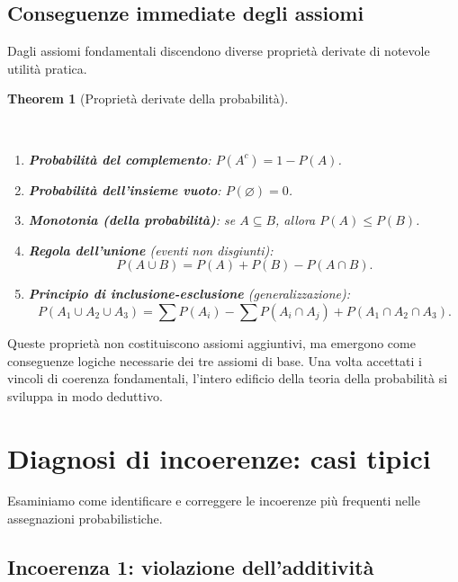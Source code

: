 \documentclass[
  letterpaper,
  DIV=11,
  numbers=noendperiod,
  oneside]{scrreprt}
\providecommand{\tightlist}{%
  \setlength{\itemsep}{0pt}\setlength{\parskip}{0pt}}
\theoremstyle{definition}
\theoremstyle{plain}
\newtheorem{theorem}{Theorem}[chapter]
\theoremstyle{definition}
\theoremstyle{remark}
\begin{document}
\subsection{Conseguenze immediate degli
assiomi}\label{conseguenze-immediate-degli-assiomi}

Dagli assiomi fondamentali discendono diverse proprietà derivate di
notevole utilità pratica.

\begin{theorem}[Proprietà derivate della
probabilità]\protect\hypertarget{thm-probability-properties}{}\label{thm-probability-properties}

~

\begin{enumerate}
\def\labelenumi{\arabic{enumi}.}
\tightlist
\item
  \textbf{Probabilità del complemento}: \(P(A^c) = 1 - P(A)\).
\item
  \textbf{Probabilità dell'insieme vuoto}: \(P(\varnothing) = 0\).
\item
  \textbf{Monotonia (della probabilità)}: se \(A \subseteq B\), allora
  \(P(A) \leq P(B)\).
\item
  \textbf{Regola dell'unione} (eventi non disgiunti):
  \[P(A \cup B) = P(A) + P(B) - P(A \cap B).\]
\item
  \textbf{Principio di inclusione-esclusione} (generalizzazione):
  \[P(A_1 \cup A_2 \cup A_3) = \sum P(A_i) - \sum P(A_i \cap A_j) + P(A_1 \cap A_2 \cap A_3).\]
\end{enumerate}

\end{theorem}

Queste proprietà non costituiscono assiomi aggiuntivi, ma emergono come
conseguenze logiche necessarie dei tre assiomi di base. Una volta
accettati i vincoli di coerenza fondamentali, l'intero edificio della
teoria della probabilità si sviluppa in modo deduttivo.

\section{Diagnosi di incoerenze: casi
tipici}\label{diagnosi-di-incoerenze-casi-tipici}

Esaminiamo come identificare e correggere le incoerenze più frequenti
nelle assegnazioni probabilistiche.

\subsection{Incoerenza 1: violazione
dell'additività}\label{incoerenza-1-violazione-delladditivituxe0}
\end{document}

